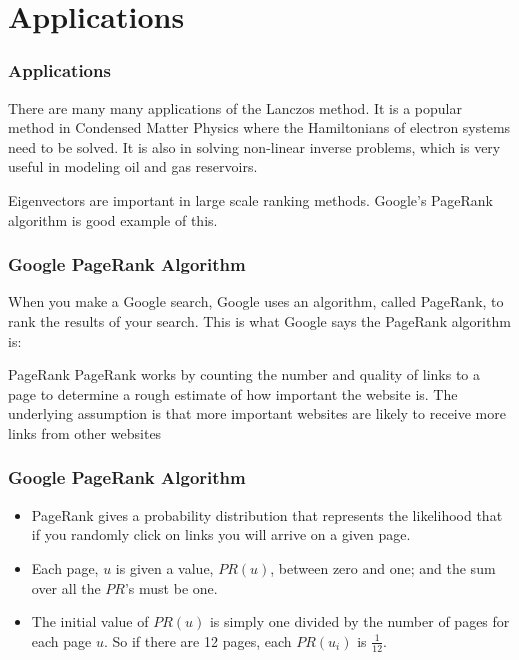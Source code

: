 \documentclass[pdf]{beamer}
\begin{document}
\begin{frame}


\end{frame}




\section{Applications}

\begin{frame}
\tableofcontents[currentsection]
\end{frame}


\begin{frame}
\frametitle{Applications}
There are many many applications of the Lanczos method. It is a popular method in Condensed Matter Physics where the Hamiltonians of electron systems need to be solved. It is also in solving non-linear inverse problems, which is very useful in modeling oil and gas reservoirs.

Eigenvectors are important in large scale ranking methods. Google's PageRank algorithm is good example of this. 
\end{frame}


\begin{frame}
\frametitle{Google PageRank Algorithm}

When you make a Google search, Google uses an algorithm, called PageRank, to rank the results of your search. This is what Google says the PageRank algorithm is:

\begin{exampleblock}{PageRank}
PageRank works by counting the number and quality of links to a page to determine a rough estimate of how important the website is. The underlying assumption is that more important websites are likely to receive more links from other websites 
\end{exampleblock}

\end{frame}



\begin{frame}
\frametitle{Google PageRank Algorithm}
\begin{itemize}
\item PageRank gives a probability distribution that represents the likelihood that if you randomly click on links you will arrive on a given page. 
\item Each page, $u$ is given a value, $PR(u)$, between zero and one; and the sum over all the $PR$'s must be one.
\item The initial value of $PR(u)$ is simply one divided by the number of pages for each page $u$. So if there are 12 pages, each $PR(u_i)$ is $\frac{1}{12}$.
\end{itemize}
\end{frame}
\end{document}
